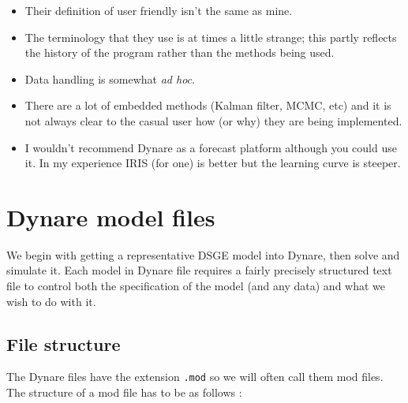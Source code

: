\documentclass[
  letterpaper,
]{book}
\providecommand{\tightlist}{%
  \setlength{\itemsep}{0pt}\setlength{\parskip}{0pt}}\usepackage{longtable,booktabs,array}
\begin{document}
\begin{tcolorbox}[enhanced jigsaw, breakable, left=2mm, arc=.35mm, toptitle=1mm, colbacktitle=quarto-callout-caution-color!10!white, opacityback=0, bottomrule=.15mm, leftrule=.75mm, opacitybacktitle=0.6, title=\textcolor{quarto-callout-caution-color}{\faFire}\hspace{0.5em}{Notable characteristics of Dynare include:}, colframe=quarto-callout-caution-color-frame, coltitle=black, titlerule=0mm, toprule=.15mm, bottomtitle=1mm, rightrule=.15mm, colback=white]

\begin{itemize}
\tightlist
\item
  Their definition of user friendly isn't the same as mine.
\item
  The terminology that they use is at times a little strange; this
  partly reflects the history of the program rather than the methods
  being used.
\item
  Data handling is somewhat \emph{ad hoc}.
\item
  There are a lot of embedded methods (Kalman filter, MCMC, etc) and it
  is not always clear to the casual user how (or why) they are being
  implemented.
\item
  I wouldn't recommend Dynare as a forecast platform although you could
  use it. In my experience IRIS (for one) is better but the learning
  curve is steeper.
\end{itemize}

\end{tcolorbox}

\hypertarget{dynare-model-files}{%
\section{Dynare model files}\label{dynare-model-files}}

We begin with getting a representative DSGE model into Dynare, then
solve and simulate it. Each model in Dynare file requires a fairly
precisely structured text file to control both the specification of the
model (and any data) and what we wish to do with it.

\hypertarget{file-structure}{%
\subsection{File structure}\label{file-structure}}

The Dynare files have the extension \texttt{.mod} so we will often call
them mod files. The structure of a mod file has to be as follows :
\end{document}
